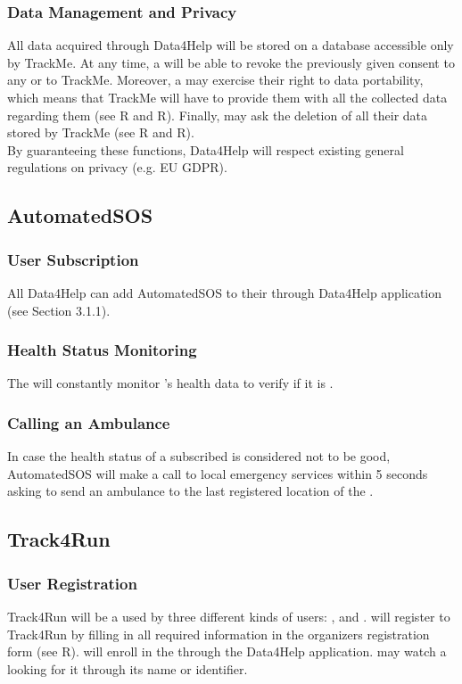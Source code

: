 \documentclass[../../rasd.tex]{subfiles}
\begin{document}
		\subsubsection{Data Management and Privacy}
		All data acquired through Data4Help will be stored on a database accessible only by TrackMe. At any time, a  will be able to revoke the previously given consent to any  or to TrackMe. Moreover, a  may exercise their right to data portability, which means that TrackMe will have to provide them with all the collected data regarding them (see R and R). Finally,  may ask the deletion of all their data stored by TrackMe (see R and R).\\
		By guaranteeing these functions, Data4Help will respect existing general regulations on privacy (e.g. EU GDPR).
	
	\subsection{AutomatedSOS}
		
		\subsubsection{User Subscription}
		All Data4Help  can add AutomatedSOS to their  through Data4Help application (see Section 3.1.1).
		
		\subsubsection{Health Status Monitoring}
		The  will constantly monitor 's health data to verify if it is .
		
		\subsubsection{Calling an Ambulance}
		In case the health status of a subscribed  is considered not to be good, AutomatedSOS will make a call to local emergency services within 5 seconds asking to send an ambulance to the last registered location of the .

	\subsection{Track4Run}
		
		\subsubsection{User Registration}
		Track4Run will be a  used by three different kinds of users: ,  and .  will register to Track4Run by filling in all required information in the organizers registration form (see R).  will enroll in the  through the Data4Help application.  may watch a  looking for it through its name or identifier.
		
\end{document}
